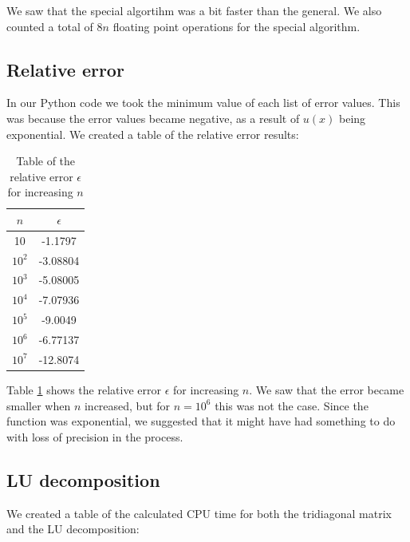 \documentclass[12pt]{article}
\begin{document}
\noindent We saw that the special algortihm was a bit faster than the general. We also counted a total of $8n$ floating point operations for the special algorithm. \\




\subsection{Relative error}

\noindent In our Python code we took the minimum value of each list of error values. This was because the error values became negative, as a result of $u(x)$ being exponential. We created a table of the relative error results:

\begin{table}[H]
    \centering
    \begin{tabular}{ c | c }
    	$n$ & $\epsilon$ \\
    	\hline
    	10 & -1.1797 \\
    	$10^2$ & -3.08804 \\
    	$10^3$ & -5.08005 \\
    	$10^4$ & -7.07936 \\
    	$10^5$ & -9.0049 \\
    	$10^6$ & -6.77137 \\
    	$10^7$ & -12.8074\\
    \end{tabular}
	\caption{Table of the relative error $\epsilon$ for increasing $n$}
    \label{tab:err}
\end{table}
\medskip

\noindent Table \ref{tab:err} shows the relative error $\epsilon$ for increasing $n$. We saw that the error became smaller when $n$ increased, but for $n = 10^6$ this was not the case. Since the function was exponential, we suggested that it might have had something to do with loss of precision in the process. 



\subsection{LU decomposition}

\noindent We created a table of the calculated CPU time for both the tridiagonal matrix and the LU decomposition:
\end{document}
